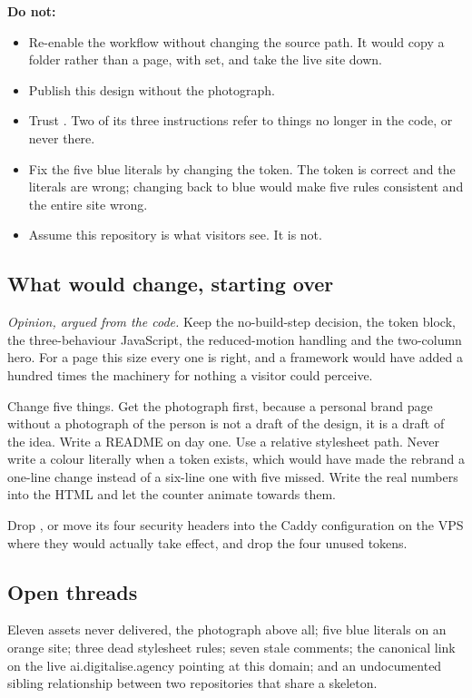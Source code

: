 \documentclass[11pt,a4paper]{article}
\begin{document}
\textbf{Do not:}
\begin{itemize}
\item Re-enable the workflow without changing the  source path. It would
  copy a folder rather than a page, with  set, and take the live site
  down.
\item Publish this design without the photograph.
\item Trust . Two of its three instructions refer to things no
  longer in the code, or never there.
\item Fix the five blue literals by changing the token. The token is correct and the
  literals are wrong; changing  back to blue would make five rules
  consistent and the entire site wrong.
\item Assume this repository is what visitors see. It is not.
\end{itemize}

\subsection{What would change, starting over}

\emph{Opinion, argued from the code.} Keep the no-build-step decision, the token
block, the three-behaviour JavaScript, the reduced-motion handling and the
two-column hero. For a page this size every one is right, and a framework would have
added a hundred times the machinery for nothing a visitor could perceive.

Change five things. Get the photograph first, because a personal brand page without
a photograph of the person is not a draft of the design, it is a draft of the idea.
Write a README on day one. Use a relative stylesheet path. Never write a colour
literally when a token exists, which would have made the rebrand a one-line change
instead of a six-line one with five missed. Write the real numbers into the HTML and
let the counter animate towards them.

Drop , or move its four security headers into the Caddy
configuration on the VPS where they would actually take effect, and drop the four
unused tokens.

\subsection{Open threads}

Eleven assets never delivered, the photograph above all; five blue literals on an
orange site; three dead stylesheet rules; seven stale comments; the canonical link
on the live ai.digitalise.agency pointing at this domain; and an undocumented
sibling relationship between two repositories that share a skeleton.
\end{document}
